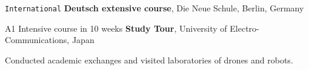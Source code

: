 \begin{rubric}{\faGlobe\texttt{International}}
    \entry*[10.2022 -- 12.2022]%
        \textbf{Deutsch extensive course}, Die Neue Schule, Berlin, Germany
        \par A1 Intensive course in 10 weeks
    \entry*[08.2018 -- 08.2018]%
        \textbf{Study Tour}, University of Electro-Communications, Japan
            \par Conducted academic exchanges and visited laboratories of drones and robots.
    \end{rubric}